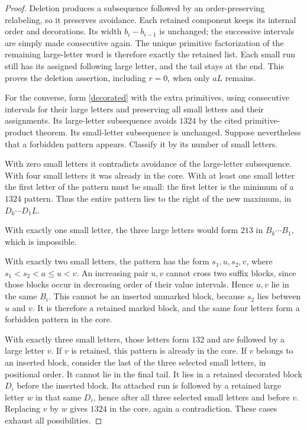 \documentclass[11pt]{article}
\begin{document}
\begin{proof}
Deletion produces a subsequence followed by an order-preserving
relabeling, so it preserves avoidance. Each retained component
keeps its internal order and decorations. Its width
$b_i-b_{i-1}$ is unchanged; the successive intervals are simply
made consecutive again. The unique primitive factorization of the
remaining large-letter word is therefore exactly the retained list.
Each small run still has its assigned following large letter,
and the tail stays at the end. This proves the deletion assertion,
including $r=0$, when only $aL$ remains.

For the converse, form \eqref{decorated} with the extra primitives,
using consecutive intervals for their large letters and preserving
all small letters and their assignments. Its large-letter
subsequence avoids $1324$ by the cited primitive-product theorem.
Its small-letter subsequence is unchanged. Suppose nevertheless
that a forbidden pattern appears. Classify it by its number of
small letters.

With zero small letters it contradicts avoidance of the large-letter
subsequence. With four small letters it was already in the core.
With at least one small letter the first letter of the pattern
must be small: the first letter is the minimum of a $1324$
pattern. Thus the entire pattern lies to the right of the new
maximum, in $D_k\cdots D_1L$.

With exactly one small letter, the three large letters would form
$213$ in $B_k\cdots B_1$, which is impossible.

With exactly two small letters, the pattern has the form
$s_1,u,s_2,v$, where $s_1<s_2<a\le u<v$. An increasing pair
$u,v$ cannot cross two suffix blocks, since those blocks occur
in decreasing order of their value intervals. Hence $u,v$ lie
in the same $B_i$. This cannot be an inserted unmarked block,
because $s_2$ lies between $u$ and $v$. It is therefore a retained
marked block, and the same four letters form a forbidden pattern
in the core.

With exactly three small letters, those letters form $132$ and
are followed by a large letter $v$. If $v$ is retained, this
pattern is already in the core. If $v$ belongs to an inserted
block, consider the last of the three selected small letters,
in positional order. It cannot lie in the final tail. It lies
in a retained decorated block $D_i$ before the inserted block.
Its attached run is followed by a retained large letter $w$ in
that same $D_i$, hence after all three selected small letters
and before $v$. Replacing $v$ by $w$ gives $1324$ in the core,
again a contradiction. These cases exhaust all possibilities.
\end{proof}
\end{document}
